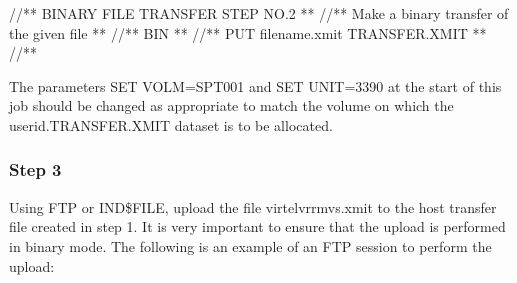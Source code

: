 \documentclass[letterpaper,10pt,english]{sphinxmanual}
\begin{document}
\begin{sphinxVerbatim}[commandchars=\\\{\}]
//*\PYGZhy{}\PYGZhy{}* BINARY FILE TRANSFER \PYGZhy{} STEP NO.2                            *\PYGZhy{}\PYGZhy{}*
//*\PYGZhy{}\PYGZhy{}* Make a binary transfer of the given file                    *\PYGZhy{}\PYGZhy{}*
//*\PYGZhy{}\PYGZhy{}* BIN                                                         *\PYGZhy{}\PYGZhy{}*
//*\PYGZhy{}\PYGZhy{}* PUT filename.xmit TRANSFER.XMIT                             *\PYGZhy{}\PYGZhy{}*
//*\PYGZhy{}\PYGZhy{}\PYGZhy{}\PYGZhy{}\PYGZhy{}\PYGZhy{}\PYGZhy{}\PYGZhy{}\PYGZhy{}\PYGZhy{}\PYGZhy{}\PYGZhy{}\PYGZhy{}\PYGZhy{}\PYGZhy{}\PYGZhy{}\PYGZhy{}\PYGZhy{}\PYGZhy{}\PYGZhy{}\PYGZhy{}\PYGZhy{}\PYGZhy{}\PYGZhy{}\PYGZhy{}\PYGZhy{}\PYGZhy{}\PYGZhy{}\PYGZhy{}\PYGZhy{}\PYGZhy{}\PYGZhy{}\PYGZhy{}\PYGZhy{}\PYGZhy{}\PYGZhy{}\PYGZhy{}\PYGZhy{}\PYGZhy{}\PYGZhy{}\PYGZhy{}\PYGZhy{}\PYGZhy{}\PYGZhy{}\PYGZhy{}\PYGZhy{}\PYGZhy{}\PYGZhy{}\PYGZhy{}\PYGZhy{}\PYGZhy{}\PYGZhy{}\PYGZhy{}\PYGZhy{}\PYGZhy{}\PYGZhy{}\PYGZhy{}\PYGZhy{}\PYGZhy{}\PYGZhy{}\PYGZhy{}\PYGZhy{}\PYGZhy{}\PYGZhy{}\PYGZhy{}\PYGZhy{}\PYGZhy{}*
\end{sphinxVerbatim}

\sphinxAtStartPar
{}

\sphinxAtStartPar
The parameters SET VOLM=SPT001 and SET UNIT=3390 at the start of this job should be changed as appropriate to match the volume on which the userid.TRANSFER.XMIT dataset is to be allocated.

\newpage


\subsubsection{Step 3}
\label{\detokenize{Installation_Guide:step-3}}
\sphinxAtStartPar
Using FTP or IND\$FILE, upload the file virtelvrrmvs.xmit to the host transfer file created in step 1. It is very important to ensure that the upload is performed in binary mode. The following is an example of an FTP session to perform the upload:
\end{document}

